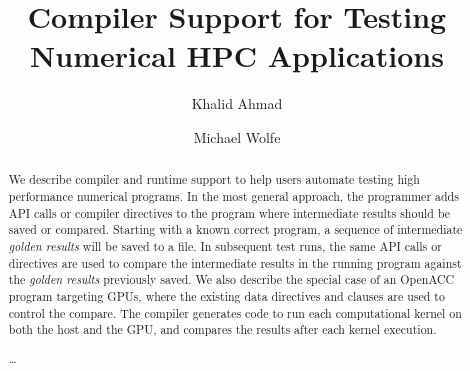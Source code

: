 \documentclass{llncs}
\begin{document}
\title{Compiler Support for Testing Numerical HPC Applications}
%
%
\author{Khalid Ahmad \and Michael Wolfe}
%
%
%

\maketitle              %

\begin{abstract}
We describe compiler and runtime support to help users automate testing high performance numerical programs.
In the most general approach, the programmer adds API calls or compiler directives to the program where intermediate results should be saved or compared.
Starting with a known correct program, a sequence of intermediate \emph{golden results} will be saved to a file.
In subsequent test runs, the same API calls or directives are used to compare the intermediate results in the running program against the \emph{golden results} previously saved.
We also describe the special case of an OpenACC program targeting GPUs, where the existing data directives and clauses are used to control the compare.
The compiler generates code to run each computational kernel on both the host and the GPU, and compares the results after each kernel execution.

\dots
{}
\end{abstract}
%









%


\end{document}
